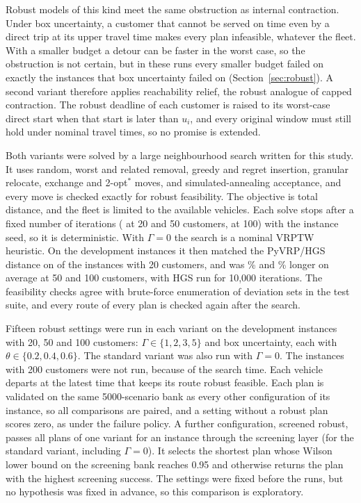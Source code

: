 \documentclass[11pt,a4paper]{article}
\begin{document}
Robust models of this kind meet the same obstruction as internal contraction.
Under box uncertainty, a customer that cannot be served on time even by a direct
trip at its upper travel time makes every plan infeasible, whatever the fleet.
With a smaller budget a detour can be faster in the worst case, so the
obstruction is not certain, but in these runs every smaller budget failed on
exactly the instances that box uncertainty failed on (Section~\ref{sec:robust}). A second variant therefore applies reachability
relief, the robust analogue of capped contraction. The robust deadline of each
customer is raised to its worst-case direct start when that start is later than
$u_i$, and every original window must still hold under nominal travel times, so
no promise is extended.

Both variants were solved by a large neighbourhood search written for this
study. It uses random, worst and related removal, greedy and regret insertion,
granular relocate, exchange and 2-opt$^*$ moves, and simulated-annealing
acceptance, and every move is checked exactly for robust feasibility. The
objective is total distance, and the fleet is limited to the available vehicles.
Each solve stops after a fixed number of iterations (\RobItersSmall{} at 20 and
50 customers, \RobItersHundred{} at 100) with the instance seed, so it is
deterministic. With $\Gamma=0$ the search is a nominal VRPTW heuristic. On the
development instances it then matched the PyVRP/HGS distance on
\RobBenchEqualTwenty{} of the \RobBenchCountTwenty{} instances with 20 customers,
and was \RobBenchGapFifty\% and \RobBenchGapHundred\% longer on average at 50 and
100 customers, with HGS run for 10,000 iterations. The feasibility checks agree
with brute-force enumeration of deviation sets in the test suite, and every route
of every plan is checked again after the search.

Fifteen robust settings were run in each variant on the development instances
with 20, 50 and 100 customers: $\Gamma\in\{1,2,3,5\}$ and box uncertainty, each
with $\theta\in\{0.2,0.4,0.6\}$. The standard variant was also run with
$\Gamma=0$. The instances with 200 customers were not run, because of the search time. Each vehicle departs at the latest time that keeps its route robust
feasible. Each plan is validated on the same 5000-scenario bank as every other
configuration of its instance, so all comparisons are paired, and a setting
without a robust plan scores zero, as under the failure policy. A further
configuration, screened robust, passes all plans of one variant for an instance
through the screening layer (for the standard variant, including $\Gamma=0$). It
selects the shortest plan whose Wilson lower bound on the screening bank reaches
0.95 and otherwise returns the plan with the highest screening success. The
settings were fixed before the runs, but no hypothesis was fixed in advance, so
this comparison is exploratory.
\end{document}
